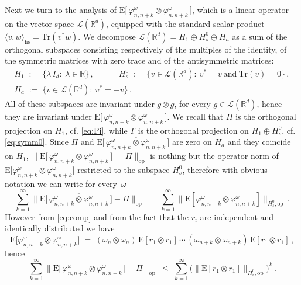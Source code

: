 \documentclass[a4paper,reqno,11pt]{amsart}
\numberwithin{equation}{section}
\newcommand{\cL}{{\ensuremath{\mathcal L}} }
\newcommand{\gl}{\lambda}
\newcommand{\go}{\omega}
\newcommand{\R}{\mathbb{R}}
\def\bE{\ensuremath{\bs{\mathrm{E}}}}
\def\bs{\boldsymbol}
\renewcommand{\phi}{\varphi}
\begin{document}
Next we turn to the analysis of
$\bE \big[\, \overline{\phi^\go_{n,n+k} \otimes \phi^\go_{n,n+k}} \,\big]$,
which is a linear operator on the vector space $\cL(\R^d)$,
equipped with the standard scalar product
$\langle v, w \rangle_{\text{hs}} = \text{Tr}(v^* w)$.
We decompose $\cL(\R^d) = H_1 \oplus H_s^0 \oplus H_a$ as a sum of
the orthogonal subspaces consisting respectively of the multiples of the identity,
of the symmetric matrices with zero trace and of the antisymmetric matrices:
\begin{gather*}
	H_1 \;:=\; \big\{ \gl\, I_d : \ \gl \in \R \big\} \,, \qquad \quad
	H_s^0 \;:=\; \big\{ v \in \cL(\R^d): \ v^* = v \ \text{and} \ \text{Tr}(v) = 0 \big\}\,,\\
	H_a \;:=\; \big\{ v \in \cL(\R^d): \ v^* = -v \big\} \,.
\end{gather*}
All of these subspaces are invariant under $g \otimes g$, for every $g \in \cL(\R^d)$,
hence they are invariant under $\bE \big[\, \overline{\phi^\go_{n,n+k} \otimes \phi^\go_{n,n+k}} \,\big]$.
We recall that $\Pi$ is the orthogonal projection on $H_1$, cf. \eqref{eq:Pi},
while $\Gamma$ is the orthogonal projection on $H_1 \oplus H_s^0$, cf. \eqref{eq:symm0}.
Since $\Pi$ and $\bE \big[\, \overline{\phi^\go_{n,n+k} \otimes \phi^\go_{n,n+k}} \,\big]$
are zero on $H_a$ and they coincide on $H_1$,
$\big\| \bE \big[\, \overline{\phi^\go_{n,n+k} \otimes \phi^\go_{n,n+k}} \,\big]
\, -\, \Pi \big\|_{\text{op}}$ is nothing but the operator norm of
$\bE \big[\phi^\go_{n,n+k} \otimes \phi^\go_{n,n+k}\big]$
restricted to the subspace $H_s^0$, therefore with obvious notation we can write
for every~$\go$
\begin{equation}
	\sum_{k=1}^\infty \big\| \bE \big[\, 
	\overline{\phi^\go_{n,n+k} \otimes \phi^\go_{n,n+k}} \,\big] - 
	\Pi \big\|_{\text{op}} \;=\; \sum_{k=1}^\infty 
	\big\| \bE [\phi^\go_{n,n+k} \otimes \phi^\go_{n,n+k}] \big\|_{H_s^0, \text{op}} \,.
\end{equation}
However from \eqref{eq:comp} and from the fact that the $r_i$ are independent and identically
distributed we have
\begin{equation} \label{eq:multip}
	\bE \big[ \phi^\go_{n,n+k} \otimes \phi^\go_{n,n+k}\big] 
	\;=\; (\go_n \otimes \go_n) \, \bE[ r_1 \otimes r_1] \, \cdots \,
	(\go_{n+k} \otimes \go_{n+k}) \, \bE[ r_1 \otimes r_1] \,,
\end{equation}
hence
\begin{equation} \label{eq:analogy3}
	\sum_{k=1}^\infty \big\| \bE \big[\, 
	\overline{\phi^\go_{n,n+k} \otimes \phi^\go_{n,n+k}} \,\big] 
	- \Pi \big\|_{\text{op}}
	\;\le\; \sum_{k=1}^\infty 
	\big( \big\| \bE[ r_1 \otimes r_1] \big\|_{H_s^0, \text{op}}\big)^k \,.
\end{equation}
\end{document}
